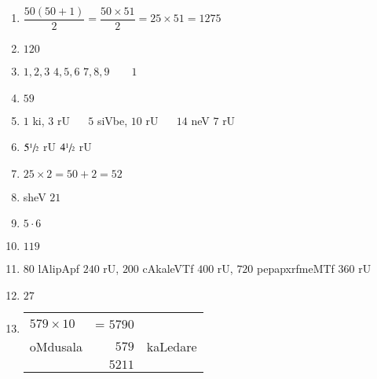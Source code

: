\begin{enumerate}
\item $\dfrac{50(50+1)}{2} = \dfrac{50 \times 51}{2} = 25 \times 51 = 1275$
  
\item $120$

\item $1 , 2, 3$ \qquad $4,5,6$ \qquad $7 , 8,9 \qquad 1$

\item $59$

\item $1$ ki, $3$ rU ~~ $5$ siVbe, $10$ rU ~~ $14$ neV $7$ rU

\item $5 \sfrac{1}{2}$ rU $4\sfrac{1}{2}$ rU

\item $25 \times 2 = 50 +2 = 52$

\item sheV $21$

\item $5 \cdot 6$
  
\item $119$

\eject

\item $80$ lAlipApf $240$ rU, $200$ cAkaleVTf $400$ rU, $720$  pepapxrfmeMTf $360$ rU

\item $27$

\item
  \qquad \begin{tabular}[t]{lrl}
    $579 \times 10$ & = $5790$ & \\
    oMdusala & $579$ & kaLedare \\\cline{2-2}
    & $5211$ &
  \end{tabular}

\end{enumerate}
